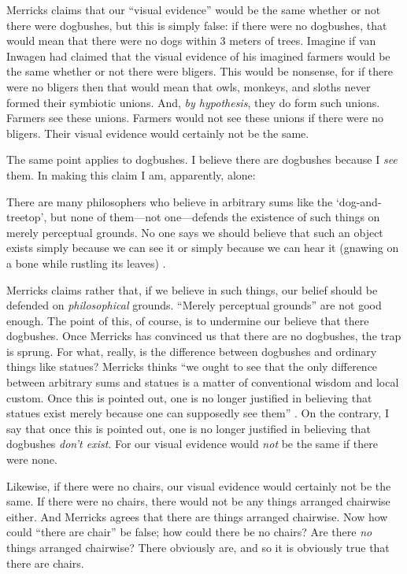 \documentclass[11pt]{article}
\newenvironment{squote}{%
\begin{spacing}{1}
       	\begin{list}{}{%
\setlength{\labelwidth}{0pt}%
\rightmargin\leftmargin%
}
\item\relax
}{%
\end{list}%
\end{spacing}
}
\begin{document}
\begin{spacing}{1.25}
Merricks claims that our ``visual evidence'' would be the same whether
or not there were dogbushes, but this is simply false: if there were
no dogbushes, that would mean that there were no dogs within 3 meters
of trees.  Imagine if van Inwagen had claimed that the visual evidence
of his imagined farmers would be the same whether or not there were
bligers.  This would be nonsense, for if there were no bligers then
that would mean that owls, monkeys, and sloths never formed their
symbiotic unions.  And, {\em by hypothesis}, they do form such
unions.  Farmers see these unions.  Farmers would not see these unions
if there were no bligers.  Their visual evidence would certainly not
be the same.

The same point applies to dogbushes.  I believe there are dogbushes
because I {\em see} them.  In making this claim I am, apparently,
alone:

\begin{squote}
There are many philosophers who believe in arbitrary sums like the
`dog-and-treetop', but none of them---not one---defends the existence
of such things on merely perceptual grounds. No one says we should
believe that such an object exists simply because we can see it or
simply because we can hear it (gnawing on a bone while rustling its
leaves) \citep[74]{merricks2001a}.
\end{squote}

Merricks claims rather that, if we believe in such things, our belief
should be defended on {\em philosophical} grounds.  ``Merely
perceptual grounds'' are not good enough.  The point of this, of
course, is to undermine our believe that there dogbushes.  Once
Merricks has convinced us that there are no dogbushes, the trap is
sprung.  For what, really, is the difference between dogbushes and
ordinary things like statues?  Merricks thinks ``we ought to see that
the only difference between arbitrary sums and statues is a matter of
conventional wisdom and local custom.  Once this is pointed out, one
is no longer justified in believing that statues exist merely because
one can supposedly see them'' \citeyearpar[75]{merricks2001a}.  On the
contrary, I say that once this is pointed out, one is no longer
justified in believing that dogbushes {\em don't exist}.  For our
visual evidence would {\em not} be the same if there were none.

Likewise, if there were no chairs, our visual evidence would certainly
not be the same.  If there were no chairs, there would not be any
things arranged chairwise either.  And Merricks agrees that there are
things arranged chairwise.  Now how could ``there are chair'' be
false; how could there be no chairs?  Are there {\em no} things
arranged chairwise?  There obviously are, and so it is obviously true
that there are chairs.


\end{spacing}
\end{document}
